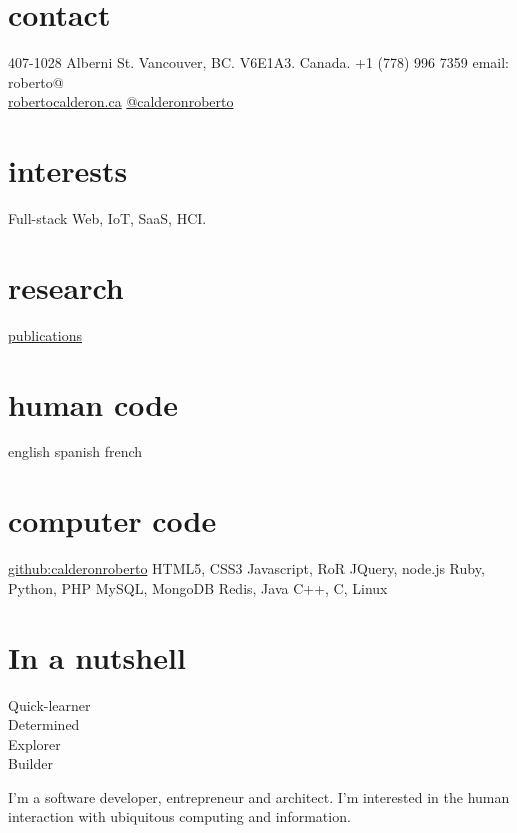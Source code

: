 \documentclass[full]{rvca}
\begin{document}
 
\begin{aside} %
\section{contact}
407-1028 Alberni St.
Vancouver, BC.
V6E1A3. Canada.
+1 (778) 996 7359
email: roberto@\\\href{http://robertocalderon.ca}{robertocalderon.ca}
\href{http://twitter.com/calderonroberto}{@calderonroberto}
% 
\QrCode
\section{interests}
Full-stack Web, IoT, SaaS, HCI.
% 
\section{research}
\href{http://robertocalderon.ca/content.php?c=publications}{publications}
% 
\section{human code}
english
spanish
french
\section{computer code}
\href{https://github.com/calderonroberto}{github:calderonroberto}
HTML5, CSS3
Javascript, RoR
JQuery, node.js
Ruby, Python, PHP
MySQL, MongoDB
Redis, Java
C++, C, Linux
% 
\section{In a nutshell}
Quick-learner\\Determined\\Explorer\\Builder
\end{aside}
 
\begin{statement}
I'm a software developer, entrepreneur and architect. I'm interested in the human interaction with ubiquitous computing and information.
\end{statement}
\end{document}
